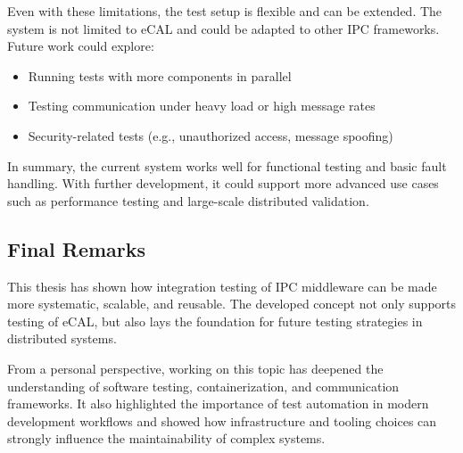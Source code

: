 \vspace{1em}
Even with these limitations, the test setup is flexible and can be extended. The system is not limited to eCAL and could be adapted to other IPC frameworks. Future work could explore:

\begin{itemize}
	\item Running tests with more components in parallel
	\item Testing communication under heavy load or high message rates
	\item Security-related tests (e.g., unauthorized access, message spoofing)
\end{itemize}

\vspace{1em}
In summary, the current system works well for functional testing and basic fault handling. With further development, it could support more advanced use cases such as performance testing and large-scale distributed validation.


\vspace{1em}
\subsection*{Final Remarks}

\vspace{1em}
This thesis has shown how integration testing of IPC middleware can be made more systematic, scalable, and reusable. The developed concept not only supports testing of eCAL, but also lays the foundation for future testing strategies in distributed systems.

\vspace{1em}
From a personal perspective, working on this topic has deepened the understanding of software testing, containerization, and communication frameworks. It also highlighted the importance of test automation in modern development workflows and showed how infrastructure and tooling choices can strongly influence the maintainability of complex systems.

